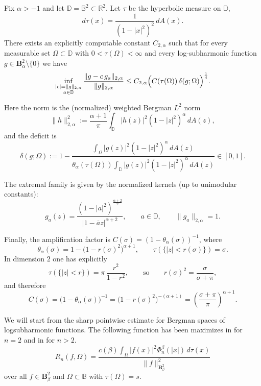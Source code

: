 \documentclass[a4paper,10pt]{amsart}
\newcommand{\D}{\mathbb{D}}
\begin{document}

\begin{numthm}[Stability in dimension $n=2$ (parameter $\alpha=\beta-2$)]\label{stabb_n2_beta}
Fix $\alpha>-1$ and let $\D=\mathbb{B}^2\subset\mathbb{R}^2$.
Let $\tau$ be the hyperbolic measure on $\D$,
\[
d\tau(x)=\frac{1}{(1-|x|^2)^2}\,dA(x).
\]
There exists an explicitly computable constant $C_{2,\alpha}$ such that for every measurable set
$\Omega\subset\D$ with $0<\tau(\Omega)<\infty$ and every log-subharmonic function
$g\in \mathbf{B}^2_{\alpha}\setminus\{0\}$ we have
\[
\inf_{\substack{|c|=\|g\|_{2,\alpha}\\ a\in\D}}
\frac{\|g-c\,g_a\|_{2,\alpha}}{\|g\|_{2,\alpha}}
\le
C_{2,\alpha}\Bigl(C(\tau(\Omega))\,\delta(g;\Omega)\Bigr)^{\frac14}.
\]

Here the norm is the (normalized) weighted Bergman $L^2$ norm
\[
\|h\|_{2,\alpha}^2 := \frac{\alpha+1}{\pi}\int_{\D} |h(z)|^2(1-|z|^2)^{\alpha}\,dA(z),
\]
and the deficit is
\[
\delta(g;\Omega)
:=
1-\frac{\displaystyle\int_\Omega |g(z)|^2(1-|z|^2)^{\alpha}\,dA(z)}
{\displaystyle\theta_\alpha(\tau(\Omega))\int_{\D}|g(z)|^2(1-|z|^2)^{\alpha}\,dA(z)}\in[0,1].
\]

The extremal family is given by the normalized kernels (up to unimodular constants):
\[
g_a(z)
=
\frac{(1-|a|^2)^{\frac{\alpha+2}{2}}}{|1-\overline{a}z|^{\alpha+2}},
\qquad a\in\D,
\qquad \|g_a\|_{2,\alpha}=1.
\]

Finally, the amplification factor is $C(\sigma)=(1-\theta_\alpha(\sigma))^{-1}$, where
\[
\theta_\alpha(\sigma)=1-\bigl(1-r(\sigma)^2\bigr)^{\alpha+1},
\qquad
\tau(\{|z|<r(\sigma)\})=\sigma.
\]
In dimension $2$ one has explicitly
\[
\tau(\{|z|<r\})=\pi\,\frac{r^2}{1-r^2},
\qquad\text{so}\qquad
r(\sigma)^2=\frac{\sigma}{\sigma+\pi},
\]
and therefore
\[
C(\sigma)=\bigl(1-\theta_\alpha(\sigma)\bigr)^{-1}
=\bigl(1-r(\sigma)^2\bigr)^{-(\alpha+1)}
=\left(\frac{\sigma+\pi}{\pi}\right)^{\alpha+1}.
\]
\end{numthm}

We will start from the sharp pointwise estimate for Bergman spaces of logsubharmonic functions.
The following function has been maximizes in \cite{RamosTilli} for $n=2$ and in \cite{kalajramos2024} for $n>2$.
\begin{equation}\label{newco}
R_n(f,\Omega)=
\frac{c(\beta) \int_\Omega  |f(x)|^2 \Phi_n^\beta(|x|) \, d\tau(x)}{\|f\|^2_{\mathbf{B}^2_\beta}}
\end{equation}
over all $f \in\mathbf{B}^2_\beta$ and $\Omega \subset \mathbb{B}$ with $\tau(\Omega) = s.$
\end{document}
